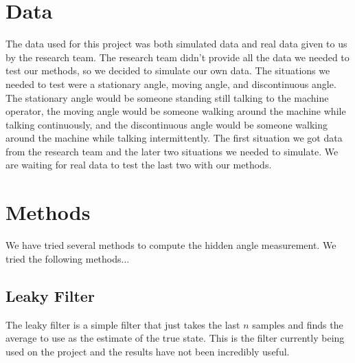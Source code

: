 \documentclass[11pt]{amsart}
\begin{document}
\section{Data}
The data used for this project was both simulated data and real data given to us by the research
team. The research team didn’t provide all the data we needed to test our methods, so we decided to
simulate our own data. The situations we needed to test were a stationary angle, moving angle, and
discontinuous angle. The stationary angle would be someone standing still talking to the machine
operator, the moving angle would be someone walking around the machine while talking continuously,
and the discontinuous angle would be someone walking around the machine while talking
intermittently. The first situation we got data from the research team and the later two situations
we needed to simulate. We are waiting for real data to test the last two with our methods. 


\section{Methods}
We have tried several methods to compute the hidden angle measurement. We tried the following methods...

\subsection{Leaky Filter}

The leaky filter is a simple filter that just takes the last $n$ samples and finds the average to use as the estimate of the true state. This is the filter currently being used on the project and the results have not been incredibly useful.
\end{document}
